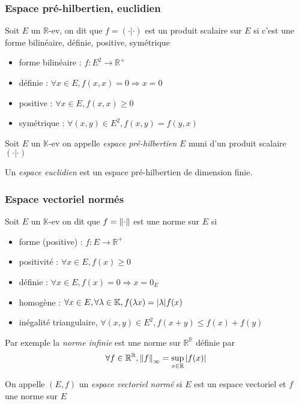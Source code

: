 \documentclass[11pt,colorlinks]{book}
\theoremstyle{mytheoremstyle}
\theoremstyle{mytheoremstyle}
\theoremstyle{mytheoremstyle}
\theoremstyle{mytheoremstyle}
\theoremstyle{mytheoremstyle}
\theoremstyle{mytheoremstyle}
\theoremstyle{mytheoremstyle}
\theoremstyle{mytheoremstyle}
\theoremstyle{myproblemstyle}
\def\mbb#1{\mathbb{#1}}
\def\bR{\mbb{R}}
\def\bK{\mbb{K}}
\begin{document}
\subsubsection{Espace pré-hilbertien, euclidien}
\label{subsubsec:h1}
\begin{definition}
  Soit $E$ un $\bR$-ev, on dit que $f = (\cdot | \cdot)$ est un produit scalaire sur $E$ si c'est une forme bilinéaire, définie, positive, symétrique
  \begin{itemize}
    \item forme bilinéaire : $f : E^2 \to \bR^+$ 
    \item définie : $\forall x \in E, f(x,x) = 0 \Rightarrow x=0$
    \item positive : $\forall x \in E, f(x,x) \geq 0$ 
    \item symétrique : $\forall (x,y) \in E^2, f(x,y) = f(y,x)$
  \end{itemize}
\end{definition}
\begin{definition}
  Soit $E$ un $\bK$-ev on appelle \textit{espace pré-hilbertien} $E$ muni d'un produit scalaire $(\cdot | \cdot)$
\end{definition}
\begin{definition}
  Un \textit{espace euclidien} est un espace pré-hilbertien de dimension finie.
\end{definition}
\subsubsection{Espace vectoriel normés}
\label{subsubsec:h2}
\begin{definition}
  Soit $E$ un $\bK$-ev on dit que $f = \norm{\cdot}$ est une norme sur $E$ si 
  \begin{itemize}
    \item forme (positive) : $f : E \to \bR^+$
    \item positivité : $\forall x \in E, f(x) \geq 0$ 
    \item définie : $\forall x \in E, f(x)=0 \Rightarrow x=0_E$
    \item homogène : $\forall x \in E, \forall \lambda \in \bK, f(\lambda x) = \abs{\lambda} f(x)$
    \item inégalité triangulaire, $\forall (x,y) \in E^2, f(x+y) \leq f(x) + f(y)$
  \end{itemize}
\end{definition}
\begin{ex}
  Par exemple la \textit{norme infinie} est une norme sur $\bR^{\bR}$ définie par 
  \begin{equation*}
    \forall f \in \bR^{\bR}, \norm{f}_{\infty} = \sup_{x \in \bR} \abs{f(x)}
  \end{equation*}
\end{ex}
\begin{definition}
  On appelle $(E,f)$ un \textit{espace vectoriel normé} si $E$ est un espace vectoriel et $f$ une norme sur $E$
\end{definition}
\end{document}
